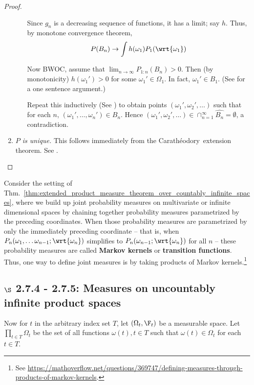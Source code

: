 \documentclass{article} %
\newcommand{\Caratheodory}{Carath\'eodory}
\newcommand{\cylinder}[1]{\widehat{#1}}
\begin{document}
\begin{proof}
\begin{enumerate}
\begin{enumerate}
Since $g_n$ is a decreasing sequence of functions, it has a limit; say $h$.  Thus, by monotone convergence theorem,
\[ P(B_n) \to \int h(\omega_1) P_1(\wrt{\omega_1}) \]

Now BWOC, assume that $\lim_{n \to \infty} P_{1:n}(B_n) > 0$.  Then (by monotonicity) $h(\omega_1')>0$ for some $\omega_1' \in \Omega_1$.  In fact, $\omega_1' \in B_1$.  (See \cite{ash2000probability} for a one sentence argument.)

Repeat this inductively (See \cite{ash2000probability}) to obtain points $(\omega_1', \omega_2', \hdots)$ such that for each $n$, $(\omega_1', \hdots, \omega_n') \in B_n$.  Hence $(\omega_1', \omega_2', \hdots) \in \cap_{n=1}^\infty \cylinder{B_n} = \emptyset$, a contradiction. 
\end{enumerate}
\item \textit{$P$ is unique.} This follows immediately from the \Caratheodory~extension theorem. See \cite{ash2000probability}.
\end{enumerate}

\end{proof}

\begin{remark-for-data-scientists}
Consider the setting of Thm.~\ref{thm:extended_product_measure_theorem_over_countably_infinite_spaces}, where we build up joint probability measures on multivariate or infinite dimensional spaces by chaining together probability measures parametrized by the preceding coordinates.   When those probability measures are parametrized by only the immediately preceding coordinate -- that is, when $P_n(\omega_1, \hdots \omega_{n-1}; \wrt{\omega_{n}})$ simplifies to $P_n(\omega_{n-1}; \wrt{\omega_{n}})$ for all $n$ -- these probability measures are called \textbf{Markov kernels} or \textbf{transition functions}.  Thus, one way to define joint measures is by taking products of Markov kernels.\footnote{See \url{https://mathoverflow.net/questions/369747/defining-measures-through-products-of-markov-kernels}.}
\end{remark-for-data-scientists}

\subsection{$\S$ 2.7.4 - 2.7.5: Measures on uncountably infinite product spaces}

Now for $t$ in the arbitrary index set $T$, let $(\Omega_t, \F_t)$ be a measurable space.  Let $\prod_{t \in T} \Omega_t$ be the set of all functions $\omega(t), t \in T$ such that $\omega(t) \in \Omega_t$ for each $t \in T$.  
\end{document}
